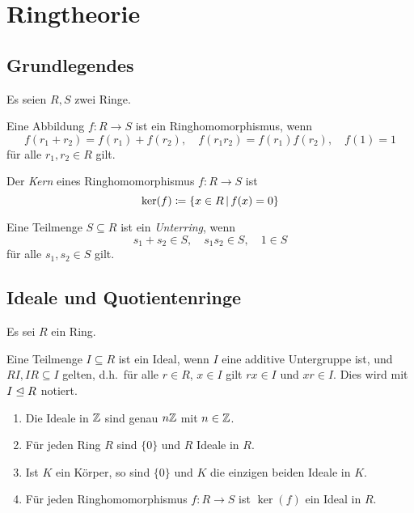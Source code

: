 \chapter{Ringtheorie}



\section{Grundlegendes}

Es seien $R, S$ zwei Ringe.

\begin{definition}
  Eine Abbildung $f \colon R \to S$ ist ein Ringhomomorphismus, wenn
  \[
      f(r_1 + r_2)
    = f(r_1) + f(r_2),
    \quad
      f(r_1 r_2)
    = f(r_1) f(r_2),
    \quad
      f(1) = 1
  \]
  für alle $r_1, r_2 \in R$ gilt.
\end{definition}

\begin{definition}
  Der \emph{Kern} eines Ringhomomorphismus $f \colon R \to S$ ist
  \[
              \ker(f)
    \defined  \{x \in R \suchthat f(x) = 0\}
  \]
\end{definition}

\begin{definition}
  Eine Teilmenge $S \subseteq R$ ist ein \emph{Unterring}, wenn
  \[
    s_1 + s_2 \in S,
    \quad
    s_1 s_2 \in S,
    \quad
    1 \in S
  \]
  für alle $s_1, s_2 \in S$ gilt.
\end{definition}





\section{Ideale und Quotientenringe}

Es sei $R$ ein Ring.

\begin{definition}
  Eine Teilmenge $I \subseteq R$ ist ein Ideal, wenn $I$ eine additive Untergruppe ist, und $RI, IR \subseteq I$ gelten, d.h.\ für alle $r \in R$, $x \in I$ gilt $rx \in I$ und $xr \in I$.
  Dies wird mit $I \mathrel{\trianglelefteq} R$ notiert.
\end{definition}

\begin{example}
  \begin{enumerate}
    \item
      Die Ideale in $\mathbb{Z}$ sind genau $n\mathbb{Z}$ mit $n \in \mathbb{Z}$.
    \item
      Für jeden Ring $R$ sind $\{0\}$ und $R$ Ideale in $R$.
    \item
      Ist $K$ ein Körper, so sind $\{0\}$ und $K$ die einzigen beiden Ideale in $K$.
    \item
      Für jeden Ringhomomorphismus $f \colon R \to S$ ist $\ker(f)$ ein Ideal in $R$.
  \end{enumerate}
\end{example}

